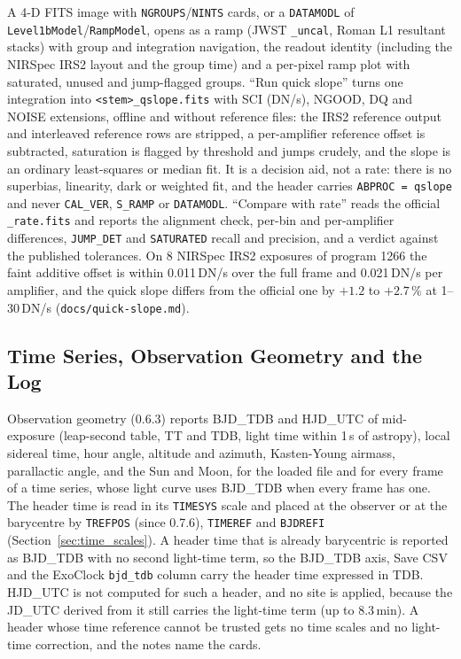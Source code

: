 \documentclass[11pt,a4paper]{article}
\newcommand{\code}[1]{\texttt{\small #1}}
\begin{document}
    A 4-D FITS image with \code{NGROUPS}/\code{NINTS} cards, or a \code{DATAMODL} of \code{Level1bModel}/\code{RampModel}, opens as a ramp (JWST \code{\_uncal}, Roman L1 resultant stacks) with group and integration navigation, the readout identity (including the NIRSpec IRS2 layout and the group time) and a per-pixel ramp plot with saturated, unused and jump-flagged groups. ``Run quick slope'' turns one integration into \code{<stem>\_qslope.fits} with SCI (DN/s), NGOOD, DQ and NOISE extensions, offline and without reference files: the IRS2 reference output and interleaved reference rows are stripped, a per-amplifier reference offset is subtracted, saturation is flagged by threshold and jumps crudely, and the slope is an ordinary least-squares or median fit. It is a decision aid, not a rate: there is no superbias, linearity, dark or weighted fit, and the header carries \code{ABPROC = qslope} and never \code{CAL\_VER}, \code{S\_RAMP} or \code{DATAMODL}. ``Compare with rate'' reads the official \code{\_rate.fits} and reports the alignment check, per-bin and per-amplifier differences, \code{JUMP\_DET} and \code{SATURATED} recall and precision, and a verdict against the published tolerances. On 8 NIRSpec IRS2 exposures of program 1266 the faint additive offset is within 0.011\,DN/s over the full frame and 0.021\,DN/s per amplifier, and the quick slope differs from the official one by $+1.2$ to $+2.7\,\%$ at 1--30\,DN/s (\code{docs/quick-slope.md}).

    \subsection{Time Series, Observation Geometry and the Log}

    Observation geometry (0.6.3) reports BJD\_TDB and HJD\_UTC of mid-exposure (leap-second table, TT and TDB, light time within 1\,s of astropy), local sidereal time, hour angle, altitude and azimuth, Kasten-Young airmass, parallactic angle, and the Sun and Moon, for the loaded file and for every frame of a time series, whose light curve uses BJD\_TDB when every frame has one. The header time is read in its \code{TIMESYS} scale and placed at the observer or at the barycentre by \code{TREFPOS} (since 0.7.6), \code{TIMEREF} and \code{BJDREFI} (Section~\ref{sec:time_scales}). A header time that is already barycentric is reported as BJD\_TDB with no second light-time term, so the BJD\_TDB axis, Save CSV and the ExoClock \code{bjd\_tdb} column carry the header time expressed in TDB. HJD\_UTC is not computed for such a header, and no site is applied, because the JD\_UTC derived from it still carries the light-time term (up to 8.3\,min). A header whose time reference cannot be trusted gets no time scales and no light-time correction, and the notes name the cards.
\end{document}
